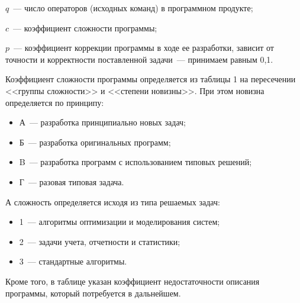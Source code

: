 $q$~--- число операторов (исходных команд) в программном продукте;

$c$~--- коэффициент сложности программы; 

$p$~--- коэффициент коррекции программы в ходе ее разработки, зависит от точности и корректности поставленной задачи~--- принимаем равным 0,1.

Коэффициент сложности программы определяется из таблицы 1 на пересечении <<группы сложности>> и <<степени новизны>>. При этом новизна определяется по принципу:
\begin{itemize}
\item А~--- разработка  принципиально новых задач;
\item Б~--- разработка  оригинальных  программ;
\item B~--- разработка  программ  с использованием типовых решений;
\item Г~--- разовая  типовая  задача.
\end{itemize}

А сложность определяется исходя из типа решаемых задач:
\begin{itemize}
\item 1~--- алгоритмы  оптимизации и моделирования  систем;
\item 2~--- задачи  учета,  отчетности  и  статистики;
\item 3~--- стандартные  алгоритмы.
\end{itemize}

Кроме того, в таблице указан коэффициент недостаточности описания программы, который потребуется в дальнейшем.

